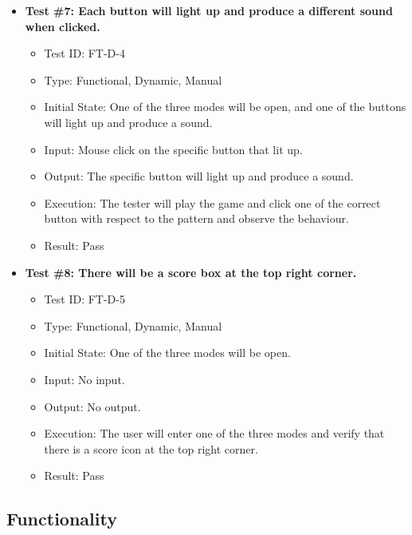 \documentclass[12pt, titlepage]{article}
\begin{document}
\begin{itemize}
\item \textbf{Test \#7: Each button will light up and produce a different sound when clicked.}
\begin{itemize}
\item Test ID: FT-D-4
\item Type: Functional, Dynamic, Manual 		
\item Initial State: One of the three modes will be open, and one of the buttons will light up and produce a sound.\item Input: Mouse click on the specific button that lit up. 					
\item Output: The specific button will light up and produce a sound.					
\item Execution: The tester will play the game and click one of the correct button with respect to the pattern and observe the behaviour.
\item Result: Pass
\end{itemize}

\item \textbf{Test \#8: There will be a score box at the top right corner.}
\begin{itemize}
\item Test ID: FT-D-5
\item Type: Functional, Dynamic, Manual 		
\item Initial State: One of the three modes will be open. 					
\item Input: No input.					
\item Output: No output. 					
\item Execution: The user will enter one of the three modes and verify that there is a score icon at the top right corner.  
\item Result: Pass
\end{itemize}

\end{itemize}

\subsection{Functionality}
\end{document}
